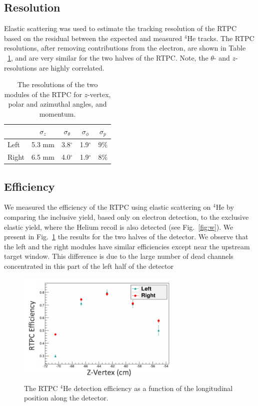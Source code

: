 \documentclass[preprint,5p]{elsarticle}
\begin{document}
\subsection{Resolution}
Elastic scattering was used to estimate the tracking resolution of the RTPC 
based on the residual between the expected and measured $^4$He tracks.  The RTPC
resolutions, after removing contributions from the electron, are shown in Table
~\ref{tab:reso}, and are very similar for the two halves of the RTPC.  Note, the
$\theta$- and $z$-resolutions are highly correlated.
\begin{table}[htbp]
\begin{center}
\begin{tabular}{|l|cccc|}
  \hline
& $\sigma_{z}$ &  $\sigma_{\theta}$ & $\sigma_{\phi}$ & $\sigma_{p}$\\
\hline
Left &  5.3 mm & 3.8$^{\circ}$ & 1.9$^{\circ}$ & 9$\%$ \\
Right & 6.5 mm & 4.0$^{\circ}$ & 1.9$^{\circ}$ & 8$\%$\\
\hline
\end{tabular}
\caption{The resolutions of the two modules of the RTPC for $z$-vertex, polar and azimuthal angles, and momentum.}
\label{tab:reso}
\end{center}
\end{table}


\subsection{Efficiency}
We measured the efficiency of the RTPC
using elastic scattering on $^4$He by comparing the inclusive yield, based
only on electron detection, to the exclusive elastic yield, where the Helium
recoil is also detected (see Fig.~\ref{fig:w}). We present in Fig.~\ref{fig:rtpc_eff}
the results for the two halves of the detector. We observe that the left and 
the right modules have similar efficiencies except near the upstream target 
window. This difference is due to the large number of dead channels concentrated
in this part of the left half of the detector

\begin{figure}[tb]
\centering
\includegraphics[width=8cm]{fig/tpceff.png}
\caption{The RTPC $^4$He detection efficiency as a function of the longitudinal 
   position along the detector.
 \label{fig:rtpc_eff}}
 \end{figure}
\end{document}
